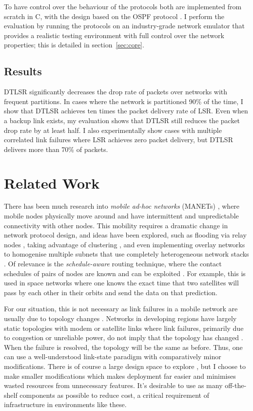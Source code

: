 \documentclass[withindex,glossary,openany]{cam-thesis}
\begin{document}
To have control over the behaviour of the protocols both are implemented from scratch in C, with the design based on the OSPF protocol \cite{OSPF}. I perform the evaluation by running the protocols on an industry-grade network emulator \cite{CORE} that provides a realistic testing environment with full control over the network properties; this is detailed in section~\ref{sec:core}.

\subsection{Results}

DTLSR significantly decreases the drop rate of packets over networks with frequent partitions. In cases where the network is partitioned 90\% of the time, I show that DTLSR achieves ten times the packet delivery rate of LSR. Even when a backup link exists, my evaluation shows that DTLSR still reduces the packet drop rate by at least half. I also experimentally show cases with multiple correlated link failures where LSR achieves zero packet delivery, but DTLSR delivers more than 70\% of packets.

\section{Related Work}

There has been much research into \textit{mobile ad-hoc networks} (MANETs) \cite{ABOLHASAN2004}, where mobile nodes physically move around and have intermittent and unpredictable connectivity with other nodes. This mobility requires a dramatic change in network protocol design, and ideas have been explored, such as flooding via relay nodes \cite{CLAUSEN2003}, taking advantage of clustering \cite{ONUR2022}, and even implementing overlay networks to homogenise multiple subnets that use completely heterogeneous network stacks \cite{SCOTT2007}. Of relevance is the \textit{schedule-aware} routing technique, where the contact schedules of pairs of nodes are known and can be exploited \cite{GARETTO2009}. For example, this is used in space networks where one knows the exact time that two satellites will pass by each other in their orbits and send the data on that prediction.

For our situation, this is not necessary as link failures in a mobile network are usually due to topology changes \cite{DIVECHA2007}. Networks in developing regions have largely static topologies with modem or satellite links where link failures, primarily due to congestion or unreliable power, do not imply that the topology has changed \cite{DEMMER2007}. When the failure is resolved, the topology will be the same as before. Thus, one can use a well-understood link-state paradigm with comparatively minor modifications. There is of course a large design space to explore \cite{FARRELL2006}, but I choose to make smaller modifications which makes deployment far easier and minimises wasted resources from unnecessary features. It's desirable to use as many off-the-shelf components as possible to reduce cost, a critical requirement of infrastructure in environments like these.
\end{document}
